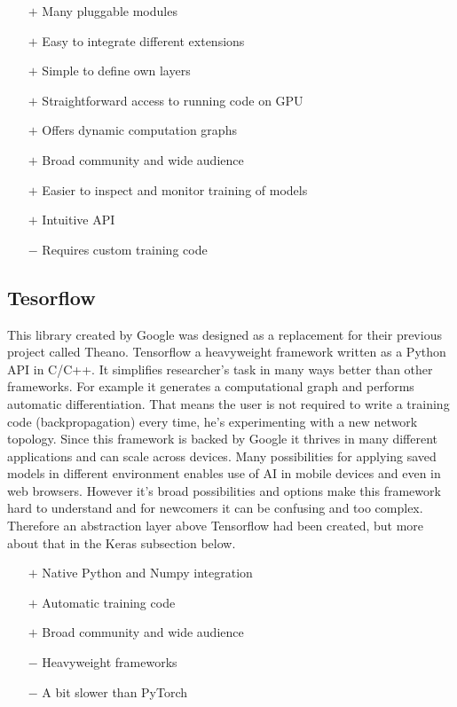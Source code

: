\begin{itemize}
    \item[$\boldsymbol{+}$] Many pluggable modules
    \item[$\boldsymbol{+}$] Easy to integrate different extensions
    \item[$\boldsymbol{+}$] Simple to define own layers
    \item[$\boldsymbol{+}$] Straightforward access to running code on GPU
    \item[$\boldsymbol{+}$] Offers dynamic computation graphs
    \item[$\boldsymbol{+}$] Broad community and wide audience
    \item[$\boldsymbol{+}$] Easier to inspect and monitor training of models
    \item[$\boldsymbol{+}$] Intuitive API
    \item[$\boldsymbol{-}$] Requires custom training code
\end{itemize}

\subsection{Tesorflow}

This library created by Google was designed as a replacement for their previous project called Theano. Tensorflow a heavyweight framework written as a Python API in C/C++. It simplifies researcher's task in many ways better than other frameworks. For example it generates a computational graph and performs automatic differentiation. That means the user is not required to write a training code (backpropagation) every time, he's experimenting with a new network topology. Since this framework is backed by Google it thrives in many different applications and can scale across devices. Many possibilities for applying saved models in different environment enables use of AI in mobile devices and even in web browsers. However it's broad possibilities and options make this framework hard to understand and for newcomers it can be confusing and too complex. Therefore an abstraction layer above Tensorflow had been created, but more about that in the Keras subsection below.

\begin{itemize}
    \item[$\boldsymbol{+}$] Native Python and Numpy integration
    \item[$\boldsymbol{+}$] Automatic training code
    \item[$\boldsymbol{+}$] Broad community and wide audience
    \item[$\boldsymbol{-}$] Heavyweight frameworks
    \item[$\boldsymbol{-}$] A bit slower than PyTorch
\end{itemize}


